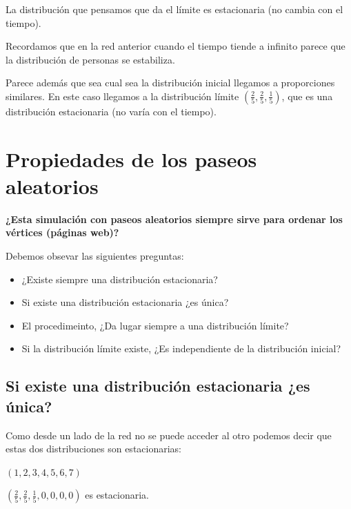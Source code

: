	La distribución que pensamos que da el límite es estacionaria (no cambia con el tiempo).

	


Recordamos que en la red anterior cuando el tiempo tiende a infinito parece que la distribución de personas se estabiliza.


Parece además que sea cual sea la distribución inicial llegamos a proporciones similares. En este caso llegamos a la distribución límite $\left(\frac{2}{5},\frac{2}{5},\frac{1}{5}\right)$, que es una distribución estacionaria (no varía con el tiempo).

\section{Propiedades de los paseos aleatorios}

\textbf{¿Esta simulación con paseos aleatorios siempre sirve para ordenar los vértices (páginas web)?}

Debemos obsevar las siguientes preguntas:

\begin{itemize}
	\item ¿Existe siempre una distribución estacionaria?
	\item Si existe una distribución estacionaria ¿es única?
	\item El procedimeinto, ¿Da lugar siempre a una distribución límite?
	\item Si la distribución límite existe, ¿Es independiente de la distribución inicial?

\end{itemize}

\subsection{Si existe una distribución estacionaria ¿es única?}
\label{P2}

\begin{center}
	\centering
\end{center}

Como desde un lado de la red no se puede acceder al otro podemos decir que estas dos distribuciones son estacionarias:

$(1, 2, 3, 4, 5, 6, 7)$

$(\frac{2}{5},\frac{2}{5},\frac{1}{5}, 0, 0 , 0, 0)$ es estacionaria.

